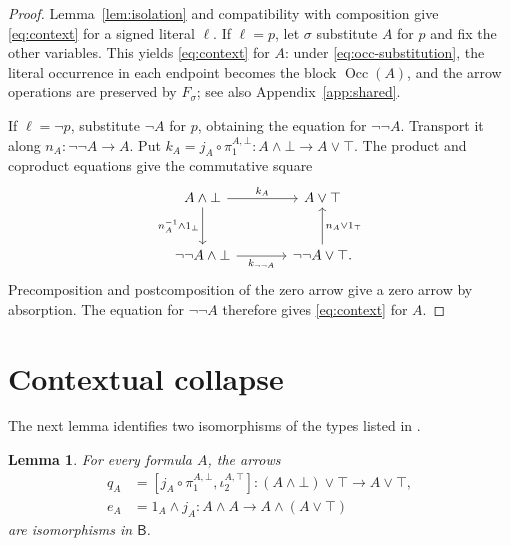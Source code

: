 \documentclass[11pt]{article}
\newtheorem{lemma}[theorem]{Lemma}
\newcommand{\B}{\mathsf B}
\newcommand{\Occ}{\operatorname{Occ}}
\begin{document}
\begin{proof}
Lemma~\ref{lem:isolation} and compatibility with composition give
\eqref{eq:context} for a signed literal $\ell$.
If $\ell=p$, let $\sigma$ substitute $A$ for $p$ and fix the other variables.
This yields \eqref{eq:context} for $A$: under
\eqref{eq:occ-substitution}, the literal occurrence in each endpoint
becomes the block $\Occ(A)$, and the arrow operations are preserved
by $F_\sigma$; see also Appendix~\ref{app:shared}.

If $\ell=\neg p$, substitute $\neg A$ for $p$, obtaining the equation
for $\neg\neg A$. Transport it along $n_A:\neg\neg A\to A$.
Put
$k_A=j_A\circ\pi_1^{A,\bot}:A\wedge\bot\to A\vee\top$.
The product and coproduct equations give the commutative square
\[
\begin{tikzcd}[column sep=large,row sep=large]
 A\wedge\bot\arrow[r,"k_A"]\arrow[d,"n_A^{-1}\wedge1_\bot"']
   &A\vee\top\\
 \neg\neg A\wedge\bot\arrow[r,"k_{\neg\neg A}"']
   &\neg\neg A\vee\top\arrow[u,"n_A\vee1_\top"'].
\end{tikzcd}
\]
Precomposition and postcomposition of the zero arrow give a zero
arrow by absorption. The equation for $\neg\neg A$ therefore gives
\eqref{eq:context} for $A$.
\end{proof}

\section{Contextual collapse}\label{sec:collapse}

The next lemma identifies two isomorphisms of the types listed in
\cite[\S12.5, p.~294]{DP}.

\begin{lemma}\label{lem:structural-isos}
For every formula $A$, the arrows
\[
 \begin{aligned}
 q_A&=[j_A\circ\pi_1^{A,\bot},\iota_2^{A,\top}]
      :(A\wedge\bot)\vee\top\longrightarrow A\vee\top,\\
 e_A&=1_A\wedge j_A
      :A\wedge A\longrightarrow A\wedge(A\vee\top)
 \end{aligned}
\]
are isomorphisms in $\B$.
\end{lemma}
\end{document}
